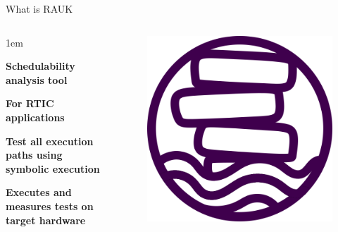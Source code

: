 \begin{frame}{What is RAUK}
    \begin{columns}
        \begin{itemize-size}{1em}
            \item \textbf{Schedulability analysis tool}
            \item \textbf{For RTIC applications}
            \item \textbf{Test all execution paths using symbolic execution}
            \item \textbf{Executes and measures tests on target hardware}
        \end{itemize-size}

        \begin{figure}
            \centering
            \includegraphics[scale=0.25]{pictures/RAUK.png}
        \end{figure}
    \end{columns}
\end{frame}
